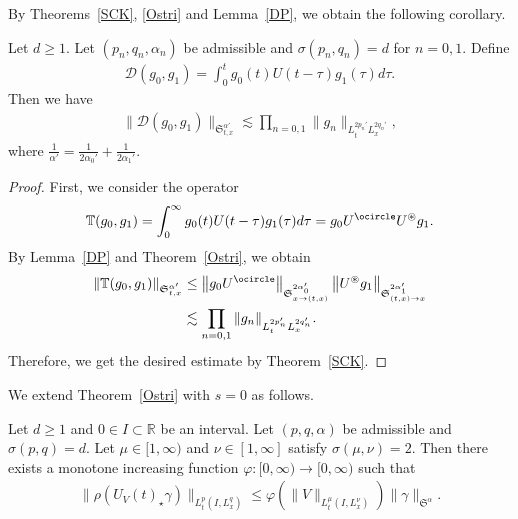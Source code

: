 \documentclass[AHL,Unicode,longabstracts,MathTools,published]{cedram}
\newcommand{\oast}{\circledast}
\newcommand{\BT}{\mathbb{T}}
\newcommand{\CD}{\mathcal{D}}
\newcommand{\FS}{\mathfrak{S}}
\newcommand{\al}{\alpha}
\newcommand{\ga}{\gamma}
\newcommand{\ph}{\varphi}
\newcommand{\ta}{\tau}
\newcommand{\si}{\sigma}
\newcommand{\rh}{\rho}
\newcommand{\I}{\infty}
\newcommand{\tx}{{t,x}}
\newcommand{\st}{\star}
\newcommand{\R}{\mathbb{R}}
\newcommand{\oc}{\ocircle}
\newcommand{\os}{\oast}
\newcommand{\ls}{\lesssim}
\begin{document}
By Theorems~\ref{SCK}, \ref{Ostri} and Lemma~\ref{DP}, we obtain the following corollary.

\begin{coro}\label{DS}
Let $d \geq 1$. Let $(p_n,q_n,\al_n)$ be admissible and $\si(p_n,q_n)=d$ for $n = 0,1$. Define
\begin{align}
\CD(g_0,g_1) = \int_0^t g_0(t)U(t-\ta)g_1(\ta)d\ta.
\end{align}
Then we have
\begin{align}
\|\CD(g_0,g_1)\|_{\FS^{\al'}_{t,x}} \ls \prod_{n=0,1} \|g_n\|_{L^{2p_n'}_t L^{2q_n'}_x},
\end{align}
where $\frac{1}{\al'} = \frac{1}{2\al_0'} + \frac{1}{2\al_1'}$.
\end{coro}

\begin{proof}
First, we consider the operator
\begin{align}
\BT(g_0,g_1) = \int_0^\I g_0(t)U(t-\ta)g_1(\ta)d\ta = g_0 U^\oc U^\os g_1.
\end{align}
By Lemma~\ref{DP} and Theorem~\ref{Ostri}, we obtain
\begin{align}
\left\|\BT(g_0,g_1)\right\|_{\FS^{\al'}_{\tx}} &\le \left\|g_0 U^\oc\right\|_{\FS^{2\al_0'}_{x \to (\tx)}} \left\|U^\os g_1\right\|_{\FS^{2\al_1'}_{(\tx)\to x}} \\
&\ls \prod_{n=0,1} \|g_n\|_{L^{2p_n'}_t L^{2q_n'}_x}.
\end{align}
Therefore, we get the desired estimate by Theorem~\ref{SCK}.
\end{proof}

We extend Theorem~\ref{Ostri} with $s=0$ as follows.

\begin{lemm}\label{U_V-U}
Let $d\geq 1$ and $0 \in I \subset \R$ be an interval. Let $(p,q,\al)$ be admissible and $\si(p,q)=d$. Let $\mu \in [1, \I)$ and $\nu \in [1, \I]$ satisfy $\si(\mu,\nu)=2$. Then there exists a monotone increasing function $\ph:[0,\I) \to [0,\I)$ such that
\begin{align}\label{U_V-U est}
\|\rh(U_V(t)_\st \ga)\|_{L^p_t(I,L^q_x)} \le \ph\left(\|V\|_{L^\mu_t(I,L^\nu_x)}\right) \|\ga\|_{\FS^\al}.
\end{align}
\end{lemm}
\end{document}
